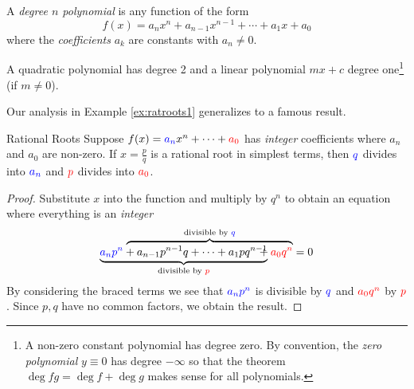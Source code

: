 
\goodbreak

\begin{defn}{}{}
	A \emph{degree $n$ polynomial} is any function of the form
	\[
		f(x)=a_nx^n+a_{n-1}x^{n-1}+\cdots+a_1x+a_0
	\]
	where the \emph{coefficients} $a_k$ are constants with $a_n\neq 0$.
\end{defn}

A quadratic polynomial has degree 2 and a linear polynomial $mx+c$ degree one\footnote{%
	A non-zero constant polynomial has degree zero. By convention, the \emph{zero polynomial} $y\equiv 0$ has degree $-\infty$ so that the theorem $\operatorname{deg} fg=\operatorname{deg} f+\operatorname{deg} g$ makes sense for all polynomials.%
} (if $m\neq 0$).\smallbreak

Our analysis in Example \ref{ex:ratroots1} generalizes to a famous result.

\begin{thm}{Rational Roots}{}
	Suppose $f(x)=\textcolor{blue}{a_n}x^n+\cdots+\textcolor{red}{a_0}$ has \emph{integer} coefficients where $a_n$ and $a_0$ are non-zero. If $x=\frac pq$ is a rational root in simplest terms, then $\textcolor{blue}{q}$ divides into $\textcolor{blue}{a_n}$ and $\textcolor{red}{p}$ divides into $\textcolor{red}{a_0}$.
\end{thm}

\begin{proof}
	Substitute $x$ into the function and multiply by $q^n$ to obtain an equation where everything is an \emph{integer}\vspace{-13pt}
	\[
		\underbrace{\textcolor{blue}{a_np^n}+a_{n-1}p^{n-1}q+\cdots+a_1pq^{n-1}}_{\text{divisible by $\textcolor{red}{p}$}} \hspace{-129pt} \overbrace{\phantom{a_{n-1}p^{n-1}q+\cdots+a_1pq^{n-1}}+\textcolor{red}{a_0q^n}}^{\text{divisible by $\textcolor{blue}{q}$}}=0
	\]
	By considering the braced terms we see that $\textcolor{blue}{a_np^n}$ is divisible by $\textcolor{blue}{q}$ and $\textcolor{red}{a_0q^n}$ by $\textcolor{red}{p}$. Since $p,q$ have no common factors, we obtain the result.
\end{proof}



